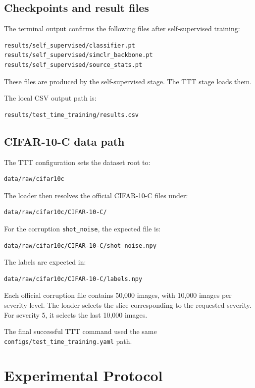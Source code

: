 \documentclass[a4paper,11pt]{article}
\begin{document}
\subsection{Checkpoints and result files}

The terminal output confirms the following files after self-supervised training:
\begin{lstlisting}
results/self_supervised/classifier.pt
results/self_supervised/simclr_backbone.pt
results/self_supervised/source_stats.pt
\end{lstlisting}
These files are produced by the self-supervised stage. The TTT stage loads them.

The local CSV output path is:
\begin{lstlisting}
results/test_time_training/results.csv
\end{lstlisting}

\subsection{CIFAR-10-C data path}

The TTT configuration sets the dataset root to:
\begin{lstlisting}
data/raw/cifar10c
\end{lstlisting}
The loader then resolves the official CIFAR-10-C files under:
\begin{lstlisting}
data/raw/cifar10c/CIFAR-10-C/
\end{lstlisting}
For the corruption \texttt{shot\_noise}, the expected file is:
\begin{lstlisting}
data/raw/cifar10c/CIFAR-10-C/shot_noise.npy
\end{lstlisting}
The labels are expected in:
\begin{lstlisting}
data/raw/cifar10c/CIFAR-10-C/labels.npy
\end{lstlisting}
Each official corruption file contains 50,000 images, with 10,000 images per severity level. The loader selects the slice corresponding to the requested severity. For severity 5, it selects the last 10,000 images.

The final successful TTT command used the same \texttt{configs/test\_time\_training.yaml} path.

\section{Experimental Protocol}
\end{document}
